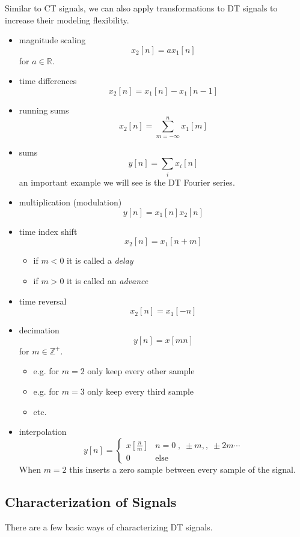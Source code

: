 Similar to CT signals, we can also apply transformations to DT signals to increase their modeling flexibility.

\begin{itemize}
\item magnitude scaling
\[
x_2[n] = a x_1[n]
\]
for $a \in \mathbb{R}$.
\item time differences
\[
x_2[n] = x_1[n] - x_1[n-1]
\]
\item running sums
\[
x_2[n] = \sum\limits_{m = -\infty}^{n} x_1[m]
\]
\item sums
\[
y[n] = \sum\limits_{i} x_i[n]
\]
an important example we will see is the DT Fourier series.
\item multiplication (modulation)
\[
y[n] = x_1[n] x_2[n]
\]
\item time index shift
\[
x_2[n] = x_1[n+m]
\]
\begin{itemize}
\item if $m < 0$ it is called a {\it delay}
\item if $m > 0$ it is called an {\it advance}
\end{itemize}

\item time reversal
\[
x_2[n] = x_1[-n]
\]

\item decimation
\[
y[n] = x[m n]
\]
for $m \in \mathbb{Z}^+$.
\begin{itemize}
\item e.g. for $m=2$ only keep every other sample
\item e.g. for $m=3$ only keep every third sample
\item etc.
\end{itemize}

\item interpolation
\[
y[n] = \left\{  \begin{array}{cl}
x\left[ \frac{n}{m}\right] & n = 0\; , \; \pm m, , \; \pm 2m \cdots\\
0 & \mbox{else}
\end{array}\right.
\]
When $m = 2$ this inserts a zero sample between every sample of the signal.
\end{itemize}

\subsection{Characterization of Signals}

There are a few basic ways of characterizing DT signals.

